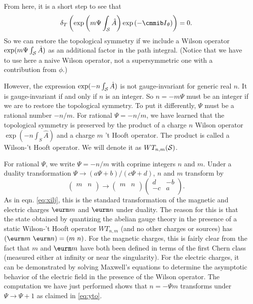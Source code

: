 {}From here, it is a short step to see that
\setcounter{equation}{15}
\begin{equation}\label{eq:flugu}
\delta_T\left(\exp\left(m\Psi\int_{{\cal S}} \hat
A\right)\exp\left(-{{\cmmib I}}_\theta\right)\right)=0.
\end{equation}
 So we can
restore the topological symmetry if we include a Wilson operator
$\exp(m\Psi\int_{{\cal S}} \hat A)$ as an additional factor in the
path integral.   (Notice that we have to use here a naive Wilson
operator, not a supersymmetric one with a contribution from
$\phi$.)

However, the expression $\exp(-n\int_{{\cal S}} \hat A)$ is not
gauge-invariant for generic real $n$.  It is gauge-invariant if
and only if $n$ is an integer. So $n=-m\Psi$ must be an integer if
we are to restore the topological symmetry. To put it differently,
$\Psi$ must be a rational number  $-n/m$. For rational
$\Psi=-n/m$, we have learned that the topological symmetry is
preserved by the product of a charge $n$ Wilson operator
$\exp(-n\int_S \hat A)$ and a charge $m$ 't Hooft operator.
 The product
is called a Wilson-'t Hooft operator. We will denote it as
$WT_{n,m}({{\cal S}})$.

For rational $\Psi$, we write $\Psi=-n/m$ with coprime integers
$n$ and $m$.  Under a duality transformation $\Psi\to
(a\Psi+b)/(c\Psi+d)$, $n$ and $m$ transform by
\begin{equation*}
\tag*{(6.17)}
\left(\begin{matrix} m  & n \\\end{matrix}\right)\to  \left(\begin{matrix} m &
n\\\end{matrix}\right) \left(\begin{matrix} d & -b\\ -c & a \\\end{matrix}\right) .
\end{equation*}
 As in
eqn. \eqref{eq:xilj}, this is the standard transformation of the magnetic
and electric charges $\eurm m$ and $\eurm n$ under duality.  The
reason for this is that the state obtained by quantizing the
abelian gauge theory in the presence of a static Wilson-'t Hooft
operator $WT_{n,m}$ (and no other charges or sources) has $({\eurm
m}~{\eurm n})=(m~n)$.  For the magnetic charges, this is fairly
clear from the fact that $m$ and ${\eurm m}$ have both been
defined in terms of the first Chern class (measured either at
infinity or near the singularity). For the electric charges, it
can be demonstrated by solving Maxwell's equations  to determine
the asymptotic behavior of the electric field in the presence of
the Wilson operator.  The computation we have just performed shows
that $n=-\Psi m$ transforms under $\Psi\to\Psi+1$ as claimed in
\eqref{eq:yto}.

